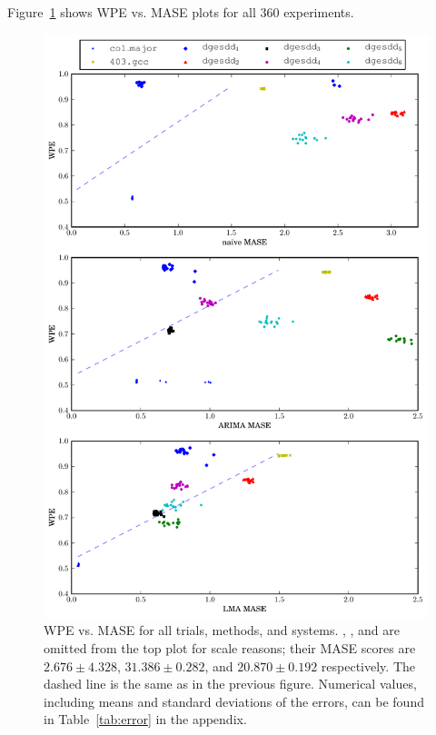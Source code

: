 Figure~\ref{fig:wpe_vs_mase_all} shows WPE vs. MASE plots for all 360
experiments.
\begin{figure}
  \centering
  \includegraphics[width=\columnwidth]{figs/predictions_vs_entropy}
\caption{WPE vs. MASE for all trials, methods, and systems. \svdone, \svdthree, and \svdfive are omitted from the top plot for scale reasons; their MASE scores are $2.676 \pm 4.328$, $31.386 \pm 0.282$, and $20.870 \pm 0.192$ respectively. The dashed line is the same as in the previous figure. Numerical values, including means and standard deviations of the errors, can be found in Table~\ref{tab:error} in the appendix.
% 
% 
}
    \label{fig:wpe_vs_mase_all}
\end{figure} 
